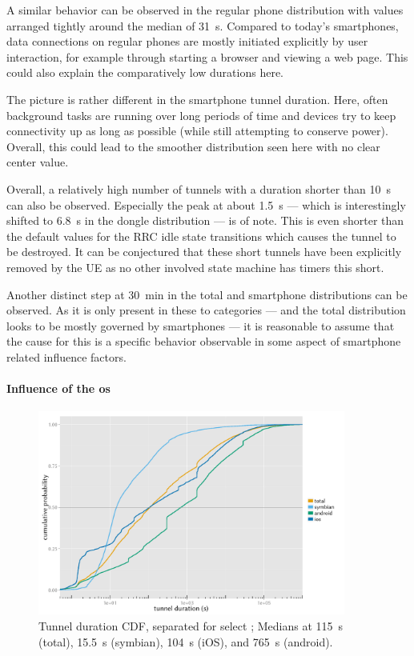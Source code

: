 A similar behavior can be observed in the regular phone distribution with values arranged tightly around the median of \SI{31}{\second}. Compared to today's smartphones, data connections on regular phones are mostly initiated explicitly by user interaction, for example through starting a browser and viewing a web page. This could also explain the comparatively low durations here.

The picture is rather different in the smartphone tunnel duration. Here, often background tasks are running over long periods of time and devices try to keep connectivity up as long as possible (while still attempting to conserve power). Overall, this could lead to the smoother distribution seen here with no clear center value.

Overall, a relatively high number of tunnels with a duration shorter than \SI{10}{\second} can also be observed. Especially the peak at about \SI{1.5}{\second} --- which is interestingly shifted to \SI{6.8}{\second} in the dongle distribution --- is of note. This is even shorter than the default values for the \gls{RRC} idle state transitions which causes the tunnel to be destroyed. It can be conjectured that these short tunnels have been explicitly removed by the \gls{UE} as no other involved state machine has timers this short.

Another distinct step at \SI{30}{\minute} in the total and smartphone distributions can be observed. As it is only present in these to categories --- and the total distribution looks to be mostly governed by smartphones --- it is reasonable to assume that the cause for this is a specific behavior observable in some aspect of smartphone related influence factors.


\paragraph{Influence of the \texorpdfstring{\acrshort{os}}{OS}}

\begin{figure}[htb]
	\centering
	\includegraphics[width=0.9\textwidth]{images/R-tunnel-duration-operating-system.pdf}
	\caption{Tunnel duration \acrshort{CDF}, separated for select ; Medians at \SI{115}{\second} (total), \SI{15.5}{\second} (symbian), \SI{104}{\second} (iOS), and \SI{765}{\second} (android).}
\label{c4:fig:cdf-duration-os}
\end{figure}

